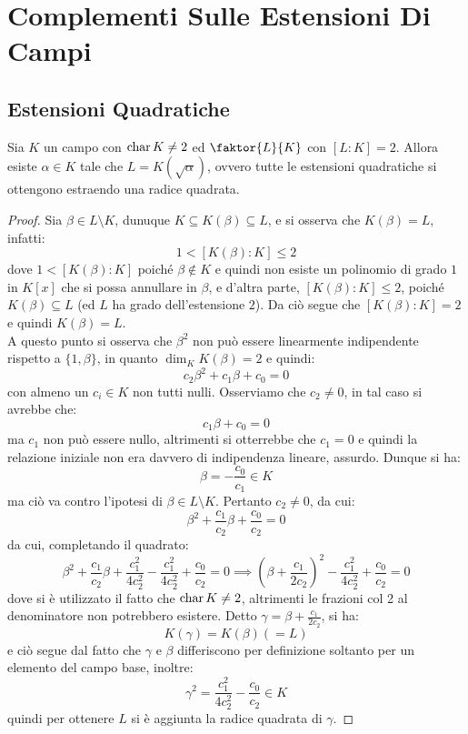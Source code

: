 \documentclass[11pt]{scrartcl}
\begin{document}
\newpage
\section{Complementi Sulle Estensioni Di Campi}
\subsection{Estensioni Quadratiche}

\begin{theorem}
Sia $K$ un campo con $\text{char}\, K \ne 2$ ed $\faktor{L}{K}$ con $[L:K] = 2$.
Allora esiste $\alpha \in K$ tale che $L = K(\sqrt{\alpha})$, ovvero tutte le 
estensioni quadratiche si ottengono estraendo una radice quadrata.
\end{theorem}

\begin{proof}
Sia $\beta \in L\setminus{K}$, dunuque $K \subseteq K(\beta) \subseteq L$, e si osserva che $K(\beta) = L$, infatti:
	\[ 1<[K(\beta) : K] \leq 2
		\]
dove $1<[K(\beta) : K]$ poiché $\beta \not\in K$ e quindi non esiste un polinomio di grado $1$ in $K[x]$ che si possa annullare in $\beta$, e d'altra parte, $[K(\beta) : K] \leq 2$,
 poiché $K(\beta) \subseteq L$ (ed $L$ ha grado dell'estensione $2$). Da ciò segue che $[K(\beta) : K] = 2$ e quindi $K(\beta) = L$. \\
A questo punto si osserva che $\beta^2$ non può essere linearmente indipendente rispetto a $\{1,\beta\}$, in quanto $\dim_K K(\beta) = 2$ e quindi:
	\[ c_2 \beta^2+c_1\beta+c_0 = 0
		\]
con almeno un $c_i \in K$ non tutti nulli. Osserviamo che $c_2 \ne 0$, in tal caso si avrebbe che:
	\[ c_1\beta + c_0 = 0
	\]
ma $c_1$ non può essere nullo, altrimenti si otterrebbe che $c_1 = 0$ e quindi la relazione iniziale non era davvero di indipendenza lineare, assurdo. Dunque si ha:
	\[ \beta = - \frac {c_0}{c_1} \in K
	\]
ma ciò va contro l'ipotesi di $\beta \in L\setminus{K}$. Pertanto $c_2 \ne 0$, da cui:
	\[  \beta^2+ \frac{c_1}{c_2}\beta+\frac{c_0}{c_2} = 0
	\]
da cui, completando il quadrato:
	\[ \beta^2+ \frac{c_1}{c_2}\beta+ \frac{c_1^2}{4c_2^2} -  \frac{c_1^2}{4c_2^2} + \frac{c_0}{c_2} = 0 
	\implies \left(\beta + \frac{c_1}{2c_2}\right)^2 -  \frac{c_1^2}{4c_2^2} + \frac{c_0}{c_2} = 0
	\]
dove si è utilizzato il fatto che $\text{char}\, K \ne 2$, altrimenti le frazioni col 2 al denominatore non potrebbero esistere. Detto $\gamma = \beta + \frac{c_1}{2c_2}$, si ha:
	\[ K(\gamma) = K(\beta) (= L)
	\]
e ciò segue dal fatto che $\gamma$ e $\beta$ differiscono per definizione soltanto per un elemento del campo base, inoltre:
	\[ \gamma^2 =  \frac{c_1^2}{4c_2^2} - \frac{c_0}{c_2} \in K
	\]
quindi per ottenere $L$ si è aggiunta la radice quadrata di $\gamma$.
\end{proof}
\end{document}
